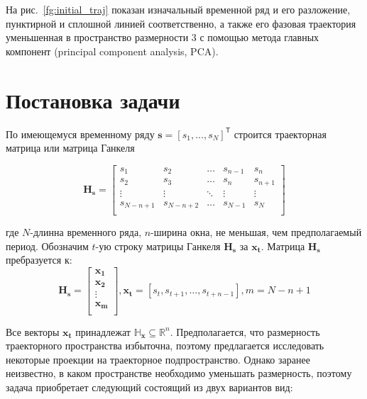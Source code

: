 \documentclass[12pt,twoside]{article}
\begin{document}
На рис.~\ref{fg:initial_traj} показан изначальный временной ряд и его разложение, пунктирной и сплошной линией соответственно, а также его фазовая траектория уменьшенная в пространство размерности 3 с помощью метода главных компонент (principal component analysis, PCA).

\section{Постановка задачи}
По имеющемуся временному ряду $\mathbf{s}=[s_1,...,s_N]^{\mathsf{T}}$ строится траекторная матрица или матрица Ганкеля

\begin{equation}
\mathbf{H_{s}} = 
\begin{bmatrix} 
	s_{1} & s_{2} & \ldots &s_{n-1} &s_{n}\\
	s_{2} & s_{3} & \ldots &s_{n} &s_{n+1}\\
	\vdots& \vdots & \ddots & \vdots & \vdots\\
	s_{N-n+1} & s_{N-n+2} &\ldots&s_{N-1} &s_{N}\\
\end{bmatrix}
\label{eq:hankel_matrix}
\end{equation}
                   
где $N$-длинна временного ряда, $n$-ширина окна, не меньшая, чем предполагаемый период. Обозначим $t$-ую строку матрицы Ганкеля $\mathbf{H_{s}}$ за $\mathbf{x_{t}}$. Матрица $\mathbf{H_{s}}$ пребразуется к:	
\begin{equation}
	\mathbf{H_{s}} = 
	\begin{bmatrix} 
                  	\mathbf{x_{1}}\\ \mathbf{x_{2}}\\
                  	\vdots\\
                  	\mathbf{x_{m}}\\
                   \end{bmatrix},
                   \mathbf{x_t}=[s_{t},s_{t+1},\ldots,s_{t+n-1}] ,
                   m = N-n+1
\label{eq:hankel_matrix_2}
\end{equation}
\vspace{\baselineskip}

Все векторы $\mathbf{x_{t}}$ принадлежат $\mathbb{H}_{\mathbf{x}} \subseteq \mathbb{R}^{n}$. Предполагается, что размерность траекторного пространства избыточна, поэтому предлагается исследовать некоторые проекции на траекторное подпространство.
Однако заранее неизвестно, в каком пространстве необходимо уменьшать размерность, поэтому задача приобретает следующий состоящий из двух вариантов вид:
\end{document}
